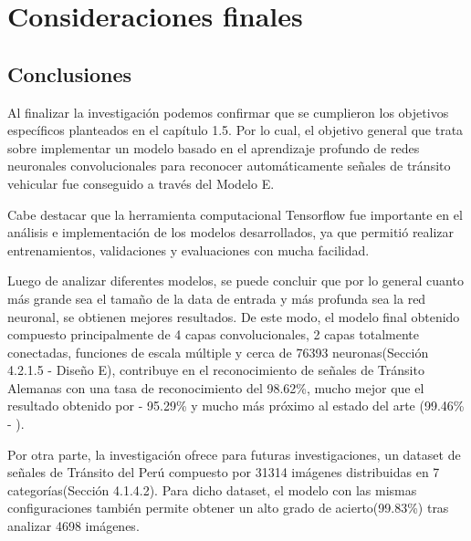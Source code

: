 \chapter{Consideraciones finales}
\setcounter{page}{104}
\renewcommand{\baselinestretch}{2} %


\section{Conclusiones}

	Al finalizar la investigación podemos confirmar que se cumplieron los objetivos específicos planteados en el capítulo 1.5. Por lo cual, el objetivo general que trata sobre implementar un modelo basado en el aprendizaje profundo de redes neuronales convolucionales para reconocer automáticamente señales de tránsito vehicular fue conseguido a través del Modelo E.

	Cabe destacar que la herramienta computacional Tensorflow fue importante en el análisis e implementación de los modelos desarrollados, ya que permitió realizar entrenamientos, validaciones y evaluaciones con mucha facilidad. 

	Luego de analizar diferentes modelos, se puede concluir que por lo general cuanto más grande sea el tamaño de la data de entrada y más profunda sea la red neuronal, se obtienen mejores resultados. De este modo, el modelo final obtenido compuesto principalmente de 4 capas convolucionales, 2 capas totalmente conectadas, funciones de escala múltiple y cerca de 76393 neuronas(Sección 4.2.1.5 - Diseño E), contribuye en el reconocimiento de señales de Tránsito Alemanas con una tasa de reconocimiento del 98.62\%, mucho mejor que el resultado obtenido por \citep{Ayuque2016} - 95.29\% y mucho más próximo al estado del arte (99.46\% - \citep{Ciresan}).

	Por otra parte, la investigación ofrece para futuras investigaciones, un dataset de señales de Tránsito del Perú compuesto por 31314 imágenes distribuidas en 7 categorías(Sección 4.1.4.2). Para dicho dataset, el modelo con las mismas configuraciones también permite obtener un alto grado de acierto(99.83\%) tras analizar 4698 imágenes. 



